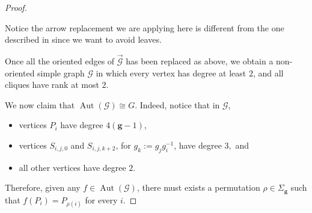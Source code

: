 \documentclass{amsart}
\theoremstyle{definition}
\theoremstyle{remark}
\newcommand{\Aut}{\operatorname{Aut}}
\begin{document}
\begin{proof}
\begin{enumerate}
\begin{center}
    \end{center}
    
\end{enumerate}

Notice the arrow replacement we are applying here is different from the one described in \cite[Schritt 2), pp.\ 243--244]{Fr39} since we want to avoid leaves.    

Once all the oriented edges of $\overrightarrow{\mathcal{G}}$ has been replaced as above, we obtain a non-oriented simple graph $\mathcal{G}$ in which every vertex has degree at least $2$, and all cliques have rank at most $2$.

We now claim that $\Aut(\mathcal{G})\cong G.$ Indeed, notice that in $\mathcal{G}$, 
\begin{itemize}[label={--}]
    \item vertices $P_i$ have degree $4(\mathbf{g}-1)$,
    \item vertices $S_{i,j,0}$ and $S_{i,j,k+2}$, for $g_k:=g_jg_i^{-1}$, have degree $3,$ and
    \item all other vertices have degree $2$.
\end{itemize}
Therefore, given any $f\in\Aut(\mathcal{G})$, there must exists a permutation $\rho\in\Sigma_\mathbf{g}$ such that $f(P_i)=P_{\rho(i)}$ for every $i.$ 


\end{proof}
\end{document}
